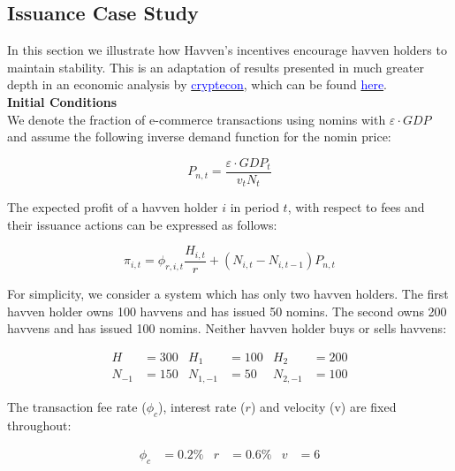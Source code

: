 \newpage

\subsection{Issuance Case Study} In this section we illustrate how Havven's
incentives encourage havven holders to maintain stability. This is an adaptation
of results presented in much greater depth in an economic analysis by \href{http://cryptecon.org/}{\textcolor{blue}{cryptecon}},
which can be found \href{https://havven.io/uploads/havven_cryptecon_report_may_2018.pdf}{\textcolor{blue}{here}}. \\

\noindent \textbf{Initial Conditions} \\

\noindent We denote the fraction of e-commerce transactions using nomins with $\varepsilon \cdot GDP$ and
assume the following inverse demand function for the nomin price:

\begin{equation*} \label{eq:nominprice} P_{n,t} = \frac{\varepsilon \cdot GDP_t}{v_tN_t} \end{equation*}

\noindent The expected profit of a havven holder \(i\) in period \(t\), with
respect to fees and their issuance actions can be expressed as follows:

\begin{equation*} 
\pi_{i,t} = \phi_{r,i,t} \frac{H_{i,t}}{r} + (N_{i,t} - N_{i,t-1}) P_{n,t} \label{eq:profit}
\end{equation*}


\noindent For simplicity, we consider a system which
has only two havven holders. The first havven holder owns 100 havvens and has
issued 50 nomins. The second owns 200 havvens and has issued 100 nomins.
Neither havven holder buys or sells havvens:

\begin{align*}
H &= 300 & H_1 &= 100 & H_2 &= 200 \\
N_{-1} &= 150 & N_{1,-1} &= 50 & N_{2,-1} &= 100
\end{align*}

\noindent The transaction fee rate (\(\phi_c\)), interest rate (\(r\)) and
velocity (v) are fixed throughout:

\begin{align*}
\phi_c &= 0.2\% & r &= 0.6\%  & v &= 6
\end{align*}

